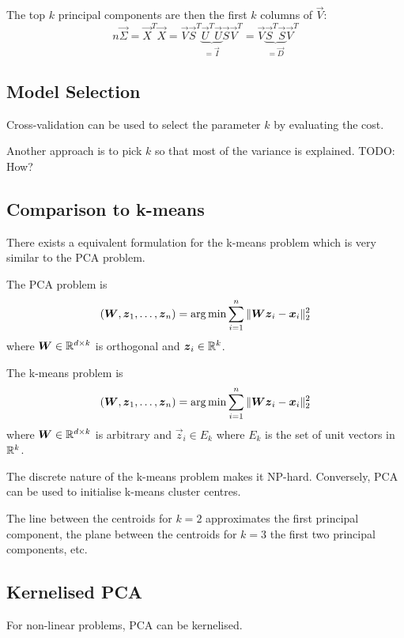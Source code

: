 The top $k$ principal components are then the first $k$
columns of $\vec{V}$:
\begin{equation*}
n \vec{\Sigma}
= \vec{X}^T \vec{X}
= \vec{V} \vec{S}^T \underbrace{\vec{U}^T \vec{U}}_{=\vec{I}} \vec{S} \vec{V}^T
= \vec{V} \underbrace{\vec{S}^T \vec{S}}_{= \vec{D}} \vec{V}^T
\end{equation*}


\subsection{Model Selection}
Cross-validation can be used to select the parameter $k$
by evaluating the cost.

Another approach is to pick $k$ so that most of the variance
is explained.
TODO: How?


\subsection{Comparison to k-means}
There exists a equivalent formulation for the k-means problem
which is very similar to the PCA problem.

The PCA problem is
\begin{equation*}
(\boldsymbol{W}, \boldsymbol{z}_1, \dotsc, \boldsymbol{z}_n) = \arg\min{
	\sum_{i=1}^n{\lVert\boldsymbol{W} \boldsymbol{z}_i - \boldsymbol{x}_i\rVert_2^2}
}
\end{equation*}
where $\boldsymbol{W} \in \mathbb{R}^{d \times k}$ is orthogonal and
$\boldsymbol{z}_i \in \mathbb{R}^k$.

The k-means problem is
\begin{equation*}
(\boldsymbol{W}, \boldsymbol{z}_1, \dotsc, \boldsymbol{z}_n) = \arg\min{
	\sum_{i=1}^n{\lVert\boldsymbol{W} \boldsymbol{z}_i - \boldsymbol{x}_i\rVert_2^2}
}
\end{equation*}
where $\boldsymbol{W} \in \mathbb{R}^{d \times k}$ is arbitrary and
$\vec{z}_i \in E_k$ where $E_k$ is the set of unit vectors
in $\mathbb{R}^k$.

The discrete nature of the k-means problem makes it NP-hard.
Conversely, PCA can be used to initialise k-means cluster centres.

The line between the centroids for $k=2$ approximates
the first principal component,
the plane between the centroids for $k=3$ the first
two principal components, etc.


\subsection{Kernelised PCA}
For non-linear problems, PCA can be kernelised.

